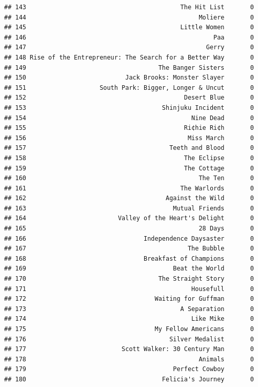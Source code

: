 \documentclass[
]{article}
\begin{document}
\begin{verbatim}
## 143                                          The Hit List       0
## 144                                               Moliere       0
## 145                                          Little Women       0
## 146                                                   Paa       0
## 147                                                 Gerry       0
## 148 Rise of the Entrepreneur: The Search for a Better Way       0
## 149                                    The Banger Sisters       0
## 150                           Jack Brooks: Monster Slayer       0
## 151                    South Park: Bigger, Longer & Uncut       0
## 152                                           Desert Blue       0
## 153                                     Shinjuku Incident       0
## 154                                             Nine Dead       0
## 155                                           Ri¢hie Ri¢h       0
## 156                                            Miss March       0
## 157                                       Teeth and Blood       0
## 158                                           The Eclipse       0
## 159                                           The Cottage       0
## 160                                               The Ten       0
## 161                                          The Warlords       0
## 162                                      Against the Wild       0
## 163                                        Mutual Friends       0
## 164                         Valley of the Heart's Delight       0
## 165                                               28 Days       0
## 166                                Independence Daysaster       0
## 167                                            The Bubble       0
## 168                                Breakfast of Champions       0
## 169                                        Beat the World       0
## 170                                    The Straight Story       0
## 171                                             Housefull       0
## 172                                   Waiting for Guffman       0
## 173                                          A Separation       0
## 174                                             Like Mike       0
## 175                                   My Fellow Americans       0
## 176                                       Silver Medalist       0
## 177                          Scott Walker: 30 Century Man       0
## 178                                               Animals       0
## 179                                        Perfect Cowboy       0
## 180                                     Felicia's Journey       0

\end{verbatim}
\end{document}
